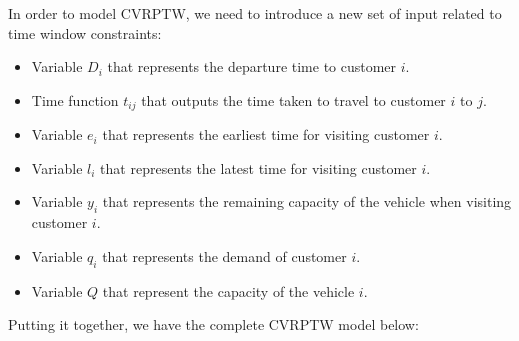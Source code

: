 In order to model CVRPTW, we need to introduce a new set of input related to time window constraints:
\begin{itemize}
\item Variable \(D_{i}\) that represents the departure time to customer \(i\).
\item Time function \(t_{ij}\) that outputs the time taken to travel to customer \(i\) to \(j\).
\item Variable \(e_{i}\) that represents the earliest time for visiting customer \(i\).
\item Variable \(l_{i}\) that represents the latest time for visiting customer \(i\).
\item Variable \(y_{i}\) that represents the remaining capacity of the vehicle when visiting customer \(i\).
\item Variable \(q_{i}\) that represents the demand of customer \(i\).
\item Variable \(Q\) that represent the capacity of the vehicle \(i\).
\end{itemize}

Putting it together, we have the complete CVRPTW model below:

\vspace{0.5cm}


